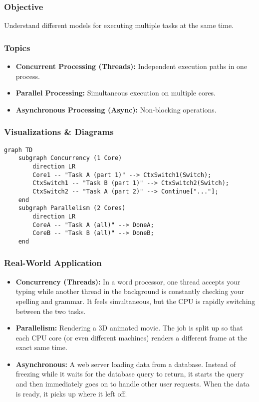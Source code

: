 \documentclass{article}
\begin{document}
\subsubsection{Objective}
Understand different models for executing multiple tasks at the same time.

\subsubsection{Topics}
\begin{itemize}
    \item \textbf{Concurrent Processing (Threads):} Independent execution paths in one process.
    \item \textbf{Parallel Processing:} Simultaneous execution on multiple cores.
    \item \textbf{Asynchronous Processing (Async):} Non-blocking operations.
\end{itemize}

\subsubsection{Visualizations \& Diagrams}

\begin{verbatim}
graph TD
    subgraph Concurrency (1 Core)
        direction LR
        Core1 -- "Task A (part 1)" --> CtxSwitch1(Switch);
        CtxSwitch1 -- "Task B (part 1)" --> CtxSwitch2(Switch);
        CtxSwitch2 -- "Task A (part 2)" --> Continue["..."];
    end
    subgraph Parallelism (2 Cores)
        direction LR
        CoreA -- "Task A (all)" --> DoneA;
        CoreB -- "Task B (all)" --> DoneB;
    end
\end{verbatim}

\subsubsection{Real-World Application}
\begin{itemize}
    \item \textbf{Concurrency (Threads):} In a word processor, one thread accepts your typing while another thread in the background is constantly checking your spelling and grammar. It feels simultaneous, but the CPU is rapidly switching between the two tasks.
    \item \textbf{Parallelism:} Rendering a 3D animated movie. The job is split up so that each CPU core (or even different machines) renders a different frame at the exact same time.
    \item \textbf{Asynchronous:} A web server loading data from a database. Instead of freezing while it waits for the database query to return, it starts the query and then immediately goes on to handle other user requests. When the data is ready, it picks up where it left off.
\end{itemize}
\end{document}
